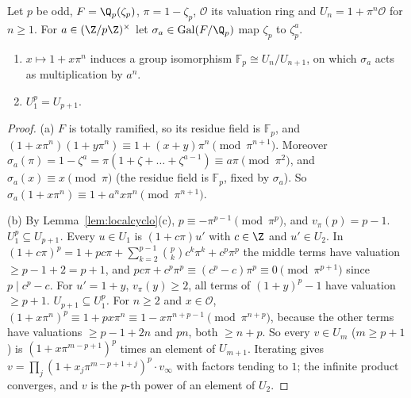 \begin{lemma}\label{lem:Up}
Let $p$ be odd, $F=\Q_p(\zeta_p)$, $\pi=1-\zeta_p$, $\mathcal O$ its valuation ring and $U_n=1+\pi^n\mathcal O$ for $n\ge1$. For $a\in(\Z/p\Z)^\times$ let
$\sigma_a\in\operatorname{Gal}(F/\Q_p)$ map $\zeta_p$ to $\zeta_p^a$.
\begin{enumerate}[label=(\alph*)]
\item $x\mapsto1+x\pi^n$ induces a group isomorphism $\mathbb F_p\cong U_n/U_{n+1}$, on which $\sigma_a$ acts as multiplication by $a^n$.
\item $U_1^p=U_{p+1}$.
\end{enumerate}
\end{lemma}
\begin{proof}
(a) $F$ is totally ramified, so its residue field is $\mathbb F_p$, and $(1+x\pi^n)(1+y\pi^n)\equiv1+(x+y)\pi^n\pmod{\pi^{n+1}}$. Moreover
$\sigma_a(\pi)=1-\zeta^a=\pi(1+\zeta+\dots+\zeta^{a-1})\equiv a\pi\pmod{\pi^2}$, and $\sigma_a(x)\equiv x\pmod\pi$ (the residue field is $\mathbb F_p$, fixed
by $\sigma_a$). So $\sigma_a(1+x\pi^n)\equiv1+a^nx\pi^n\pmod{\pi^{n+1}}$.

(b) By Lemma~\ref{lem:localcyclo}(c), $p\equiv-\pi^{p-1}\pmod{\pi^p}$, and $v_\pi(p)=p-1$. \emph{$U_1^p\subseteq U_{p+1}$.} Every $u\in U_1$ is
$(1+c\pi)u'$ with $c\in\Z$ and $u'\in U_2$. In $(1+c\pi)^p=1+pc\pi+\sum_{k=2}^{p-1}\binom pkc^k\pi^k+c^p\pi^p$ the middle terms have valuation
$\ge p-1+2=p+1$, and $pc\pi+c^p\pi^p\equiv(c^p-c)\pi^p\equiv0\pmod{\pi^{p+1}}$ since $p\mid c^p-c$. For $u'=1+y$, $v_\pi(y)\ge2$, all terms of
$(1+y)^p-1$ have valuation $\ge p+1$. \emph{$U_{p+1}\subseteq U_1^p$.} For $n\ge2$ and $x\in\mathcal O$,
$(1+x\pi^n)^p\equiv1+px\pi^n\equiv1-x\pi^{n+p-1}\pmod{\pi^{n+p}}$, because the other terms have valuations $\ge p-1+2n$ and $pn$, both $\ge n+p$.
So every $v\in U_m$ ($m\ge p+1$) is $(1+x\pi^{m-p+1})^p$ times an element of $U_{m+1}$. Iterating gives $v=\prod_{j}(1+x_j\pi^{m-p+1+j})^p\cdot
v_\infty$ with factors tending to $1$; the infinite product converges, and $v$ is the $p$-th power of an element of $U_2$.
\end{proof}

